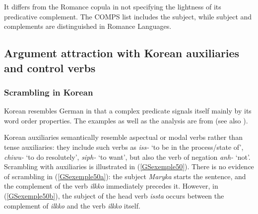 \documentclass[output=paper]{langsci/langscibook}
\begin{document}
{It differs from the Romance copula in not specifying the lightness of its predicative complement. The COMPS list includes the subject, while subject and complements are distinguished in Romance Languages.


\subsection{Argument attraction with Korean auxiliaries and control verbs}\label{GSsection4.2}

\subsubsection{Scrambling in Korean}\label{GSsection4.2.1}
 
Korean resembles German in that a complex predicate signals itself mainly by its word order properties. The examples as well as the analysis are from \cite{CC1998} (see also \citealt{Sells1991, Yoo2003, Kim2016a-u}).

Korean auxiliaries semantically resemble aspectual or modal verbs rather than tense auxiliaries: they include such verbs as \textit{iss-} `to be in the process/state of', \textit{chiwu-} `to do resolutely’, \textit{siph-} `to want', but also the verb of negation \textit{anh-} `not'. Scrambling with auxiliaries is illustrated in (\ref{GSexemple50}). There is no evidence of scrambling in (\ref{GSexemple50a}): the subject \textit{Maryka} starts the sentence, and the complement of the verb \textit{ilkko} immediately precedes it. However, in (\ref{GSexemple50b}), the subject of the head verb \textit{issta} occurs between the complement of \textit{ilkko} and the verb \textit{ilkko} itself. 

\begin{exe}
	\ex \label{GSexemple50} 
	\begin{xlist}
        \label{GSexemple50a}

        \label{GSexemple50b}
		   

\end{xlist}
\end{exe}}
\end{document}

